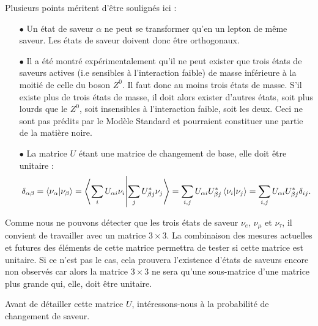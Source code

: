         Plusieurs points méritent d'être soulignés ici :
        \begin{itemize}
          \item[$\bullet$] Un état de saveur $\alpha$ ne peut se transformer qu'en un lepton de même saveur. Les états de saveur doivent donc être orthogonaux.
          \item[$\bullet$] Il a été montré expérimentalement qu'il ne peut exister que trois états de saveurs actives (i.e sensibles à l'interaction faible)\cite{pdg2018} de masse inférieure à la moitié de celle du boson $Z^0$. Il faut donc au moins trois états de masse. S'il existe plus de trois états de masse, il doit alors exister d'autres états, soit plus lourds que le $Z^0$, soit insensibles à l'interaction faible, soit les deux. Ceci ne sont pas prédits par le Modèle Standard et pourraient constituer une partie de la matière noire.
          \item[$\bullet$] La matrice $U$ étant une matrice de changement de base, elle doit être unitaire :
          \begin{equation*}
            \delta_{\alpha\beta} = \braket{\nu_{\alpha}}{\nu_{\beta}} = \braket{\sum_i U_{\alpha i}\nu_i}{\sum_j U_{\beta j}^*\nu_j} = \sum_{i,j} U_{\alpha i}U_{\beta j}^* \braket{\nu_i}{\nu_j} = \sum_{i,j} U_{\alpha i}U_{\beta j}^* \delta_{ij}.
          \end{equation*}
        \end{itemize}
        Comme nous ne pouvons détecter que les trois états de saveur $\nu_e$, $\nu_{\mu}$ et $\nu_{\tau}$, il convient de travailler avec un matrice $3\times3$. La combinaison des mesures actuelles et futures des éléments de cette matrice\cite{Qian2013} permettra de tester si cette matrice est unitaire. Si ce n'est pas le cas, cela prouvera l'existence d'états de saveurs encore non observés car alors la matrice $3\times3$ ne sera qu'une sous-matrice d'une matrice plus grande qui, elle, doit être unitaire.
        
        Avant de détailler cette matrice $U$, intéressons-nous à la probabilité de changement de saveur.

